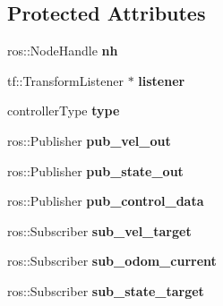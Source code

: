 \subsection*{Protected Attributes}
\begin{DoxyCompactItemize}
\item 
ros\+::\+Node\+Handle {\bfseries nh}\hypertarget{classController_a24e3d3c2536f6ed29018bad1fd53dae2}{}\label{classController_a24e3d3c2536f6ed29018bad1fd53dae2}

\item 
tf\+::\+Transform\+Listener $\ast$ {\bfseries listener}\hypertarget{classController_afea373f808d583e4ad613f119439a8f5}{}\label{classController_afea373f808d583e4ad613f119439a8f5}

\item 
controller\+Type {\bfseries type}\hypertarget{classController_af2488a28d3390288db92fa1d92aaed52}{}\label{classController_af2488a28d3390288db92fa1d92aaed52}

\item 
ros\+::\+Publisher {\bfseries pub\+\_\+vel\+\_\+out}\hypertarget{classController_a8428549596cff57f48390ac25706545a}{}\label{classController_a8428549596cff57f48390ac25706545a}

\item 
ros\+::\+Publisher {\bfseries pub\+\_\+state\+\_\+out}\hypertarget{classController_a6abeaf23d1c17d6af6eecf7d1479fe31}{}\label{classController_a6abeaf23d1c17d6af6eecf7d1479fe31}

\item 
ros\+::\+Publisher {\bfseries pub\+\_\+control\+\_\+data}\hypertarget{classController_afde3eefcf7ac040b2a38a8d1e95a6077}{}\label{classController_afde3eefcf7ac040b2a38a8d1e95a6077}

\item 
ros\+::\+Subscriber {\bfseries sub\+\_\+vel\+\_\+target}\hypertarget{classController_a1ecc749bf5bd484c978940c5a6afe03f}{}\label{classController_a1ecc749bf5bd484c978940c5a6afe03f}

\item 
ros\+::\+Subscriber {\bfseries sub\+\_\+odom\+\_\+current}\hypertarget{classController_a855093341ac8afa84efd841654fedaf5}{}\label{classController_a855093341ac8afa84efd841654fedaf5}

\item 
ros\+::\+Subscriber {\bfseries sub\+\_\+state\+\_\+target}\hypertarget{classController_adabc3d493b55a60400c74bd4264dbc6e}{}\label{classController_adabc3d493b55a60400c74bd4264dbc6e}


\end{DoxyCompactItemize}
